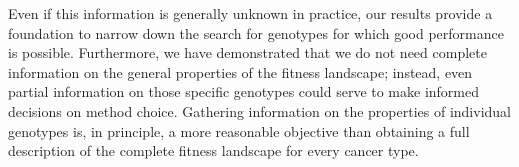 \documentclass[a4paper,10pt]{article}
\newcommand{\idea}[1]{\textcolor{red}{#1}}
\begin{document}
  Even if this information is generally unknown in practice,
  our results provide a foundation to narrow down the
  search for genotypes for which good performance is possible.
  Furthermore, we have demonstrated that we do not need complete
  information on the general properties of the fitness landscape; instead, even partial
  information on those specific genotypes could serve to make informed decisions
  on method choice. Gathering information on the properties of individual
  genotypes is, in principle, a more reasonable objective than obtaining a full
  description of the complete fitness landscape for every cancer type.

%
\end{document}
